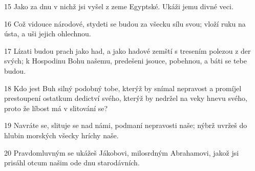 \par 15 Jako za dnu v nichž jsi vyšel z zeme Egyptské. Ukáži jemu divné veci.
\par 16 Což vidouce národové, stydeti se budou za všecku sílu svou; vloží ruku na ústa, a uši jejich ohlechnou.
\par 17 Lízati budou prach jako had, a jako hadové zemští s tresením polezou z der svých; k Hospodinu Bohu našemu, predešeni jsouce, pobehnou, a báti se tebe budou.
\par 18 Kdo jest Buh silný podobný tobe, kterýž by snímal nepravost a promíjel prestoupení ostatkum dedictví svého, kterýž by nedržel na veky hnevu svého, proto že líbost má v slitování se?
\par 19 Navráte se, slituje se nad námi, podmaní nepravosti naše; nýbrž uvržeš do hlubin morských všecky hríchy naše.
\par 20 Pravdomluvným se ukážeš Jákobovi, milosrdným Abrahamovi, jakož jsi prisáhl otcum našim ode dnu starodávních.


